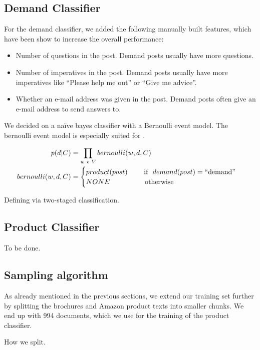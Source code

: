 \subsection{Demand Classifier}
For the demand classifier, we added the following manually built features, which have been show to increase the overall performance:
\begin{itemize}
	\item Number of questions in the post. Demand posts usually have more questions.
	\item Number of imperatives in the post. Demand posts usually have more imperatives like ``Please help me out'' or ``Give me advice''.
	\item Whether an e-mail address was given in the post. Demand posts often give an e-mail address to send answers to.
\end{itemize}

We decided on a na\"{i}ve bayes classifier with a Bernoulli event model.
The bernoulli event model is especially suited for .

\begin{equationBlock}
\begin{align*}
	p(d|C) &= \prod_{w~\epsilon~V} bernoulli(w, d, C) \\
	bernoulli(w, d, C) &=
	\begin{cases}
		product(post)~~~~~~~\text{if }~demand(post) = \operatorname{``demand''} \\
		NONE~~~~~~~~~~~~~~~\text{otherwise}
	\end{cases}
	\end{align*}
	\caption{Defining \nto via two-staged classification.}
\end{equationBlock}

\subsection{Product Classifier}
To be done.

\subsection{Sampling algorithm}
As already mentioned in the previous sections, we extend our training set further by splitting the brochures and Amazon product texts into smaller chunks.
We end up with 994 documents, which we use for the training of the product classifier.

How we split.
